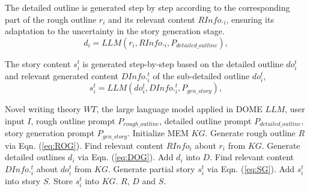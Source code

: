 
The detailed outline  is generated step by step according to the corresponding part of the rough outline $r_i$ and its relevant content $RInfo._i$, ensuring its adaptation to the uncertainty in the story generation stage. 
\begin{equation}
\label{eq:DOG}
d_i=LLM(r_i,RInfo._i,P_{detailed\_outline}),
\end{equation}

The story content $s_i^t$ is generated step-by-step based on the detailed outline $do_i^t$ and relevant generated content $DInfo._i^t$ of the sub-detailed outline $do_i^t$,  
\begin{equation}
\label{eq:SG}
s_i^t=LLM(do_i^t,DInfo._i^t,P_{gen\_story}),
\end{equation}


\begin{algorithm}[t]
    \caption{Inference Pipeline for \methodname}
    \label{alg:DO_S}
    \begin{algorithmic}[1]
    \small
    \REQUIRE Novel writing theory $WT$, the large language model applied in DOME ${LLM}$, user input $I$, rough outline prompt $P_{rough\_outline}$, detailed outline prompt $P_{detailed\_outline}$, story generation prompt $P_{gen\_story}$.
    \STATE Initialize MEM $KG$.
    \STATE  Generate rough outline $R$ via Eqn. (\ref{eq:ROG}).
            \STATE Find relevant content $RInfo_i$ about $r_i$ from $KG$.
            \STATE Generate detailed outlines $d_i$ via Eqn. (\ref{eq:DOG}).
            \STATE Add $d_i$ into $D$.
                \STATE Find relevant content $DInfo._i^t$ about $do_i^t$ from $KG$.
                \STATE Generate partial story $s_i^t$ via Eqn. (\ref{eq:SG}).
                \STATE Add $s_i^t$ into story $S$.
                \STATE Store $s_i^t$ into $KG$.
            \ENDFOR
        \ENDFOR
        \RETURN $R$, $D$ and $S$.
    \end{algorithmic}
  
\end{algorithm}


